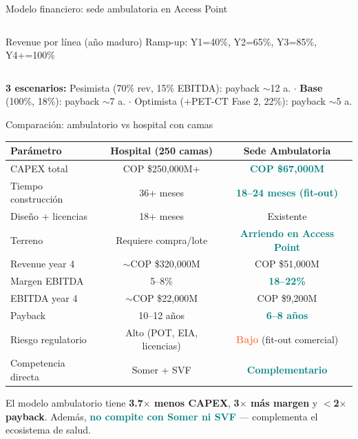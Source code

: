 \documentclass[aspectratio=169, 11pt]{beamer}
\newcommand{\highlight}[1]{\textcolor{teal}{\textbf{#1}}}
\newcommand{\danger}[1]{\textcolor{coral}{\textbf{#1}}}
\begin{document}
\begin{frame}{Modelo financiero: sede ambulatoria en Access Point}
\begin{columns}[T]
\begin{exampleblock}{\small Revenue por línea (año maduro)}
\vspace{2pt}
{\tiny Ramp-up: Y1=40\%, Y2=65\%, Y3=85\%, Y4+=100\%}
\end{exampleblock}
\end{columns}

\vspace{3pt}
{\tiny\textbf{3 escenarios:} Pesimista (70\% rev, 15\% EBITDA): payback $\sim$12 a. $\cdot$ \textbf{Base} (100\%, 18\%): payback $\sim$7 a. $\cdot$ Optimista (+PET-CT Fase 2, 22\%): payback $\sim$5 a.}
\end{frame}

\begin{frame}{Comparación: ambulatorio vs hospital con camas}
\begin{center}
{\small
\begin{tabular}{@{}lcc@{}}
\toprule
\textbf{Parámetro} & \textbf{Hospital (250 camas)} & \textbf{Sede Ambulatoria} \\
\midrule
\rowcolor{teal!8}
CAPEX total & COP \$250,000M+ & \highlight{COP \$67,000M} \\
Tiempo construcción & 36+ meses & \highlight{18--24 meses (fit-out)} \\
\rowcolor{teal!6}
Diseño + licencias & 18+ meses & Existente \\
Terreno & Requiere compra/lote & \highlight{Arriendo en Access Point} \\
\rowcolor{teal!8}
Revenue year 4 & $\sim$COP \$320,000M & COP \$51,000M \\
Margen EBITDA & 5--8\% & \highlight{18--22\%} \\
\rowcolor{teal!6}
EBITDA year 4 & $\sim$COP \$22,000M & COP \$9,200M \\
Payback & 10--12 años & \highlight{6--8 años} \\
\rowcolor{coral!6}
Riesgo regulatorio & Alto (POT, EIA, licencias) & \danger{Bajo} (fit-out comercial) \\
Competencia directa & Somer + SVF & \highlight{Complementario} \\
\bottomrule
\end{tabular}
}
\end{center}

\vspace{4pt}
\begin{exampleblock}{}
\centering\footnotesize
El modelo ambulatorio tiene \textbf{3.7$\times$ menos CAPEX}, \textbf{3$\times$ más margen} y \textbf{$<$2$\times$ payback}. Además, \highlight{no compite con Somer ni SVF} --- complementa el ecosistema de salud.
\end{exampleblock}
\end{frame}
\end{document}
